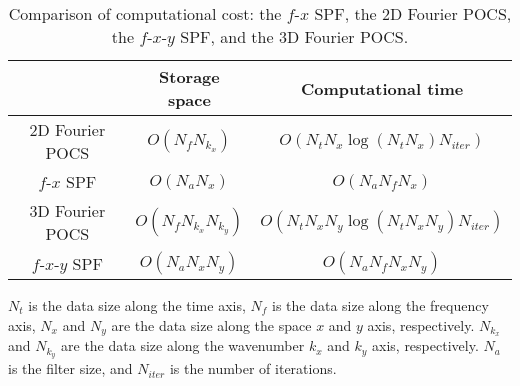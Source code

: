 \begin{table}
    \renewcommand\tabcolsep{3.5pt} 
    \renewcommand{\arraystretch}{1.3} 
    \caption{
        Comparison of computational cost: the $f$-$x$ SPF, the 2D
        Fourier POCS, the $f$-$x$-$y$ SPF, and the 3D Fourier POCS. }
    \label{tb:cost}
    \centering
    \begin{threeparttable}
        \begin{tabular}{|c|c|c|}
            \toprule
                            & Storage space
                            & Computational time                                  \\
            \midrule
            2D Fourier POCS & $ O(N_{f}N_{k_{x}}) $
                            & $ O(N_{t}N_{x}\log(N_{t}N_{x}) N_{iter}) $          \\
            $f$-$x$ SPF     & $ O(N_{a}N_{x}) $
                            & $ O(N_{a}N_{f}N_{x}) $                              \\
            3D Fourier POCS & $ O(N_{f}N_{k_{x}}N_{k_{y}}) $
                            & $ O(N_{t}N_{x}N_{y}\log(N_{t}N_{x}N_{y})N_{iter}) $ \\
            $f$-$x$-$y$ SPF & $ O(N_{a}N_{x}N_{y}) $
                            & $ O(N_{a}N_{f}N_{x}N_{y}) $                         \\
            \bottomrule
        \end{tabular}

        \begin{tablenotes}
            $N_{t}$ is the data size along the time axis,
            $N_{f}$ is the data size along the frequency axis,
            $N_{x}$ and $N_{y}$ are the data size along the space
            $x$ and $y$ axis, respectively.
            $N_{k_{x}}$ and $N_{k_{y}}$ are the data size along
            the wavenumber $k_{x}$ and $k_{y}$ axis, respectively.
            $N_{a}$ is the filter size,
            and $N_{iter}$ is the number of iterations.

        \end{tablenotes}
    \end{threeparttable}

\end{table}

